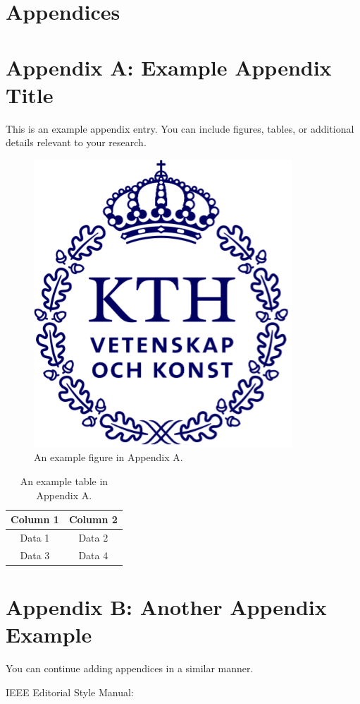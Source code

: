 \documentclass[a4paper,12pt,twocolumn]{article}
\numberwithin{figure}{section}
\numberwithin{table}{section}
\begin{document}
\section*{Appendices} %
\renewcommand{\thesubsection}{\Alph{subsection}} %

\section{Appendix A: Example Appendix Title}
\label{appendix:A}
This is an example appendix entry. You can include figures, tables, or additional details relevant to your research.

\begin{figure}[htbp]
    \centering
    \includegraphics[width=0.4\linewidth]{kthLogga.png}  %
    \caption{An example figure in Appendix A.}
    \label{fig:appendixA}  
\end{figure}

\begin{table}[htbp]
    \centering
    \begin{tabular}{|c|c|}
        \hline
        Column 1 & Column 2 \\
        \hline
        Data 1 & Data 2 \\
        Data 3 & Data 4 \\
        \hline
    \end{tabular}
    \caption{An example table in Appendix A.}
    \label{tab:appendixA}  
\end{table}

\newpage
\section{Appendix B: Another Appendix Example}
\label{appendix:B}
You can continue adding appendices in a similar manner.

IEEE Editorial Style Manual: 
	
\end{document}
